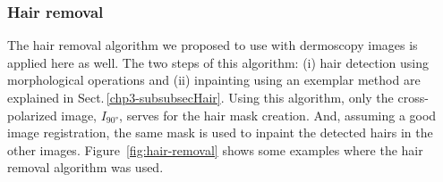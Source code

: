 \subsubsection{Hair removal}

The hair removal algorithm we proposed to use with dermoscopy images is applied here as well. 
The two steps of this algorithm: (i) hair detection using morphological operations and (ii) inpainting using an exemplar method are explained in Sect.\,\ref{chp3-subsubsecHair}.
Using this algorithm, only the cross-polarized image, $I_{\ang{90}}$, serves for the hair mask creation.
And, assuming a good image registration, the same mask is used to inpaint the detected hairs in the other images. 
Figure~\ref{fig:hair-removal} shows some examples where the hair removal algorithm was used. 
\begin{figure}
	\hfill
	\hfill
	\\
	\hfill
	\hfill

\end{figure}
